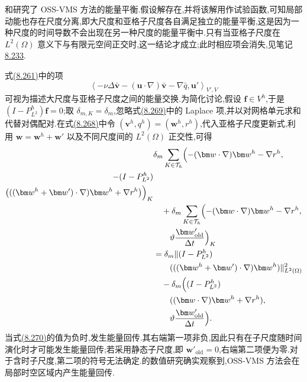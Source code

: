\begin{note}[能量平衡]
\label{note:vms-oss-energy-balance}
\textcite{PrincipeCodinaHenke2010}和\textcite{CodinaPrincipeBadia2011}研究了 OSS-VMS 方法的能量平衡.假设解存在,并将该解用作试验函数,可知局部动能也存在尺度分离,即大尺度和亚格子尺度各自满足独立的能量平衡,这是因为一种尺度的时间导数不会出现在另一种尺度的能量平衡中.只有当亚格子尺度在 $L^2(\Omega)$ 意义下与有限元空间正交时,这一结论才成立;此时相应项会消失,见笔记\hyperref[note:vms-oss-method]{8.233}.
\end{note}

\begin{note}[能量回传]
\label{note:vms-oss-backscatter}
式\hyperref[eq:vms-oss-large-scale-integration-by-parts]{(8.261)}中的项
\begin{equation}\label{eq:vms-oss-energy-exchange-term}
 \left\langle-\nu\Delta\bar{\bm v}
   -(\bm u\cdot\nabla)\bar{\bm v}-\nabla\bar q,
   \bm u'\right\rangle_{V',V}
\end{equation}
可视为描述大尺度与亚格子尺度之间的能量交换.为简化讨论,假设 $\bm f\in V^h$,于是 $(I-P^h_{L^2})\bm f=0$;取 $\delta_{m,K}=\delta_m$,忽略式\hyperref[eq:vms-oss-energy-exchange-term]{(8.269)}中的 Laplace 项,并以对网格单元求和代替对偶配对.在式\hyperref[eq:vms-oss-subscale-update]{(8.268)}中令 $(\bm v^h,q^h)=(\bm w^h,r^h)$,代入亚格子尺度更新式,利用 $\bm w=\bm w^h+\bm w'$ 以及不同尺度间的 $L^2(\Omega)$ 正交性,可得
\begin{equation}\label{eq:vms-oss-backscatter-criterion}
\begin{aligned}
 &\delta_m\sum_{K\in\mathcal T_h}
   \Bigl(-(\bm w\cdot\nabla)\bm w^h-\nabla r^h,\\
   -(I-P^h_{L^2})\\
   \bigl(((\bm w^h+\bm w')\cdot\nabla)\bm w^h
       +\nabla r^h\bigr)\Bigr)_K\\
 &\quad+\delta_m\sum_{K\in\mathcal T_h}
   \Bigl(-(\bm w\cdot\nabla)\bm w^h-\nabla r^h,\\
   &\qquad\vartheta\frac{\bm w'_{\mathrm{old}}}{\Delta t}\Bigr)_K\\
 &=\delta_m\|(I-P^h_{L^2})\\
  &\qquad(((\bm w^h+\bm w')\cdot\nabla)\bm w^h)\|^2_{L^2(\Omega)}\\
 &\quad-\delta_m\Bigl((I-P^h_{L^2})\\
  &\qquad((\bm w\cdot\nabla)\bm w^h+\nabla r^h),\\
   &\qquad\vartheta\frac{\bm w'_{\mathrm{old}}}{\Delta t}\Bigr).
\end{aligned}
\end{equation}
当式\hyperref[eq:vms-oss-backscatter-criterion]{(8.270)}的值为负时,发生能量回传.其右端第一项非负,因此只有在子尺度随时间演化时才可能发生能量回传;若采用静态子尺度,即 $\bm w'_{\mathrm{old}}=0$,右端第二项便为零.对于含时子尺度,第二项的符号无法确定.\textcite{PrincipeCodinaHenke2010}的数值研究确实观察到,OSS-VMS 方法会在局部时空区域内产生能量回传.
\end{note}


